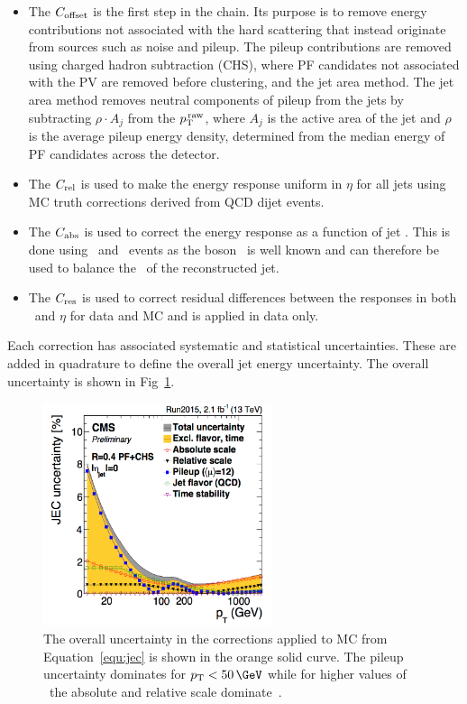 \begin{itemize}
\item The $C_{\rm{offset}}$ is the first step in the chain. Its purpose is to remove
energy contributions not associated with the hard scattering that instead originate from sources
such as noise and pileup. The pileup contributions are removed using charged
hadron subtraction (CHS), where PF candidates not associated with the PV
are removed before clustering, and the jet area method. The jet area method removes neutral components
of pileup from the jets by subtracting $\rho \cdot A_j$
from the $p^{\,\rm{raw}}_{\rm{T}}$, where $A_j$ is the active area of the jet and $\rho$ 
is the average pileup energy density, determined from the median energy of PF candidates
across the detector. 
\item The $C_{\rm{rel}}$ is used to make the energy response uniform in $\eta$ for all jets using MC truth corrections derived from QCD dijet events.
\item The $C_{\rm{abs}}$ is used to correct the energy response as a function of jet \pt. This is done using \zj~and \gj~events as
the boson \pt~is well known and can therefore be used to balance the \pt~of the reconstructed jet.
\item The $C_{\rm{res}}$ is used to correct residual differences between the responses in both \pt~and $\eta$ for data and MC and is applied in data only.
\end{itemize}

Each correction has associated systematic and statistical uncertainties. These are added in quadrature to define the overall jet energy uncertainty. The 
overall uncertainty is shown in Fig~\ref{fig:jec_unc}.

\begin{figure}
\centering
    \includegraphics[width=0.6\textwidth]{./Figures/reconstruction/jec_unc.png}
  \caption{\label{fig:jec_unc} The overall uncertainty in the corrections applied to MC from Equation~\ref{equ:jec} is 
  shown in the orange solid curve. The pileup uncertainty dominates for $\pt < 50\,\GeV$ while for higher values of \pt~the absolute and relative scale dominate~\cite{jec_fig}.}
\end{figure}

